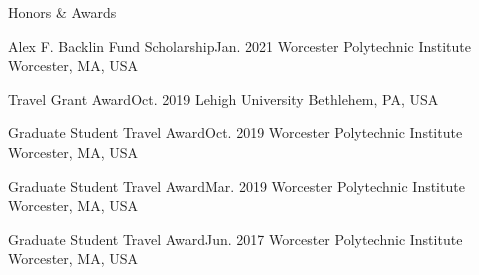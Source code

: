 \documentclass{resume} %
\begin{document}
\begin{rSection}{Honors \& Awards}

\begin{nSubsection}
{Alex F. Backlin Fund Scholarship}{Jan. 2021}
{Worcester Polytechnic Institute}
{Worcester, MA, USA}
\end{nSubsection}

\begin{nSubsection}
{Travel Grant Award}{Oct. 2019}
{Lehigh University}
{Bethlehem, PA, USA}
\end{nSubsection}

\begin{nSubsection}
{Graduate Student Travel Award}{Oct. 2019}
{Worcester Polytechnic Institute}
{Worcester, MA, USA}
\end{nSubsection}

\begin{nSubsection}
{Graduate Student Travel Award}{Mar. 2019}
{Worcester Polytechnic Institute}
{Worcester, MA, USA}
\end{nSubsection}

\begin{nSubsection}
{Graduate Student Travel Award}{Jun. 2017}
{Worcester Polytechnic Institute}
{Worcester, MA, USA}
\end{nSubsection}

\end{rSection}
\end{document}
